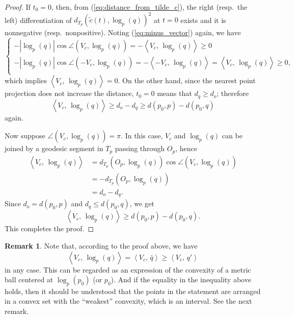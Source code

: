 \documentclass[12pt]{amsart}
\numberwithin{equation}{section}
\theoremstyle{plain}
\theoremstyle{definition}
\newtheorem{Remark}[Theorem]{Remark}
\theoremstyle{remark}
\newcommand{\tcprj}{\log}
\newcommand{\inner}[2]{\left\langle #1,\, #2 \right\rangle}
\begin{document}
\begin{proof}
 If  $t_0=0$, then, from (\ref{eq:distance_from_tilde_c}),  
 the right (resp.~the left) differentiation of 
 $d_{T_p}(\tilde c(t), \tcprj_p(q))^2$ at $t=0$ exists and it is 
 nonnegative (resp.~nonpositive).  Noting (\ref{eq:minus_vector}) again,
 we have
 \begin{equation*}
 \begin{cases}
  - |\tcprj_p(q)| \cos \angle(V_c,\tcprj_p(q))
  = -\inner{V_c}{\tcprj_p(q)} \geq 0  \\
  - |\tcprj_p(q)| \cos \angle(-V_c, \tcprj_p(q))
  = -\inner{-V_c}{\tcprj_p(q)}
  = \inner{V_c}{\tcprj_p(q)} \geq 0,  \\
 \end{cases}\end{equation*}
 which implies $\inner{V_c}{\tcprj_p(q)} = 0$. 
 On the other hand, since the nearest point projection does not increase
 the distance, $t_0=0$ means that $d_q \geq d_o$;
 therefore 
 \begin{equation*}
  \inner{V_c}{\tcprj_p(q)}
  \geq d_o - d_q 
  \geq d(p_0,p)-d(p_0,q)
 \end{equation*}
 again. 

 Now suppose $\angle(V_c, \tcprj_p(q)) = \pi$.  In this case, 
 $V_c$ and $\tcprj_p(q)$ can be joined by a geodesic segment in $T_p$
 passing through $O_p$, hence
 \begin{equation*}
\begin{split}
 \inner{V_c}{\tcprj_p(q)}
  & = d_{T_p}(O_p, \tcprj_p(q)) \cos \angle (V_c, \tcprj_p(q)) \\
  & = -d_{T_p}(O_p, \tcprj_p(q))\\ 
  & = d_o - d_q. 
\end{split} 
\end{equation*}
 Since $d_o=d(p_0,p)$ and $d_q \leq d(p_0,q)$, we get 
\begin{equation*}
 \inner{V_c}{\tcprj_p(q)} \geq d(p_0,p) -d(p_0,q). 
\end{equation*}
This completes the proof. 
\end{proof}

\begin{Remark}
\label{rem:pi_p(q)_and_bar_q}
 Note that, according to the proof above, we have
 \begin{equation*}
  \inner{V_c}{\tcprj_p(q)} = \inner{V_c}{\bar q}
  \geq \inner{V_c}{q'}
 \end{equation*}
 in any case. 
 This can be regarded as an expression of 
 the convexity of a metric ball centered at $\tcprj_p(p_0)$ (or $p_0$). 
 And if the equality in the inequality above holds, 
 then it should be understood that the points in the statement are
 arranged in a convex set with the ``weakest'' convexity, which is 
 an interval. 
 See the next remark.
\end{Remark}
\end{document}
